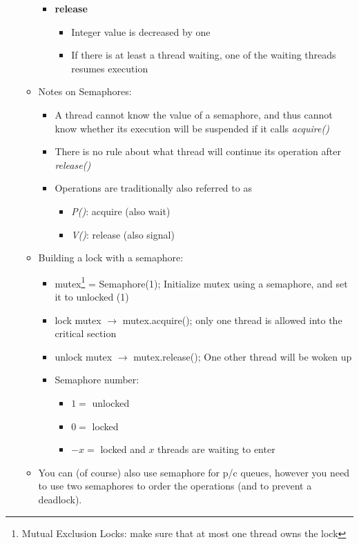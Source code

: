 \documentclass[a4paper]{article}
\begin{document}
\begin{itemize}
\begin{itemize}
\begin{itemize}
\begin{itemize}
\end{itemize}
\item \textbf{release}
\begin{itemize}
\item Integer value is decreased by one
\item If there is at least a thread waiting, one of the waiting threads resumes execution
\end{itemize}
\end{itemize}
\item Notes on Semaphores:
\begin{itemize}
\item A thread cannot know the value of a semaphore, and thus cannot know whether its execution will be suspended if it calls \textsl{acquire()}
\item There is no rule about what thread will continue its operation after \textsl{release()}
\item Operations are traditionally also referred to as
\begin{itemize}
\item \textsl{P()}: acquire (also wait)
\item \textsl{V()}: release (also signal)
\end{itemize}
\end{itemize}
\item Building a lock with a semaphore:
\begin{itemize}
\item mutex\footnote{Mutual Exclusion Locks: make sure that at most one thread owns the lock} = Semaphore(1); Initialize mutex using a semaphore, and set it to unlocked (1)
\item lock mutex $\to$ mutex.acquire(); only one thread is allowed into the critical section
\item unlock mutex $\to$ mutex.release(); One other thread will be woken up
\item Semaphore number:
\begin{itemize}
\item $1=$ unlocked
\item $0=$ locked
\item $-x=$ locked and $x$ threads are waiting to enter
\end{itemize}
\end{itemize}
\item You can (of course) also use semaphore for p/c queues, however you need to use two semaphores to order the operations (and to prevent a deadlock).
\end{itemize}


\end{itemize}
\end{document}
